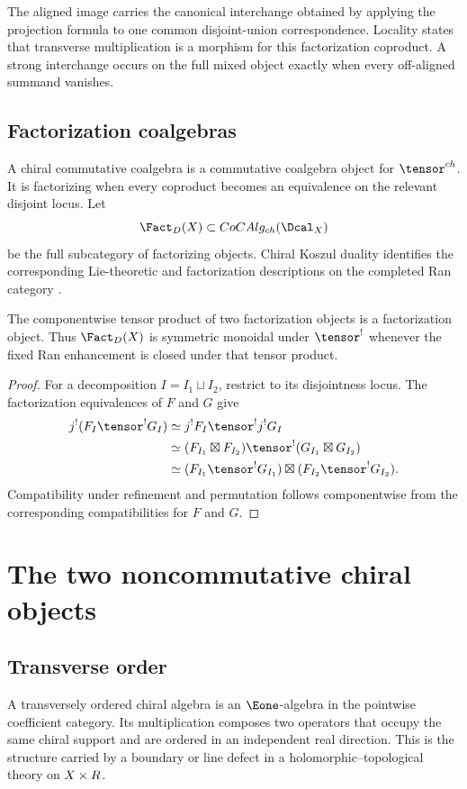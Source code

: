 The aligned image carries the canonical interchange obtained by applying the projection formula to one common disjoint-union correspondence.  Locality states that transverse multiplication is a morphism for this factorization coproduct.  A strong interchange occurs on the full mixed object exactly when every off-aligned summand vanishes.

\section{Factorization coalgebras}
A chiral commutative coalgebra is a commutative coalgebra object for $\tensor^{\ch}$. It is factorizing when every coproduct becomes an equivalence on the relevant disjoint locus. Let
\[
 \Fact_D(X)\subset \operatorname{CoCAlg}_{\ch}(\Dcal_X)
\]
be the full subcategory of factorizing objects. Chiral Koszul duality identifies the corresponding Lie-theoretic and factorization descriptions on the completed Ran category \cite{FG12,Heuts}.

\begin{proposition}
The componentwise tensor product of two factorization objects is a factorization object. Thus $\Fact_D(X)$ is symmetric monoidal under $\tensor^!$ whenever the fixed Ran enhancement is closed under that tensor product.
\end{proposition}
\begin{proof}
For a decomposition $I=I_1\sqcup I_2$, restrict to its disjointness locus. The factorization equivalences of $F$ and $G$ give
\[
\begin{aligned}
 j^!(F_I\tensor^!G_I)
 &\simeq j^!F_I\tensor^!j^!G_I\\
 &\simeq (F_{I_1}\boxtimes F_{I_2})\tensor^!
          (G_{I_1}\boxtimes G_{I_2})\\
 &\simeq (F_{I_1}\tensor^!G_{I_1})\boxtimes
          (F_{I_2}\tensor^!G_{I_2}).
\end{aligned}
\]
Compatibility under refinement and permutation follows componentwise from the corresponding compatibilities for $F$ and $G$.
\end{proof}


\chapter{The two noncommutative chiral objects}
\section{Transverse order}
A transversely ordered chiral algebra is an $\Eone$-algebra in the pointwise coefficient category.  Its multiplication composes two operators that occupy the same chiral support and are ordered in an independent real direction.  This is the structure carried by a boundary or line defect in a holomorphic--topological theory on $X\times R$.

